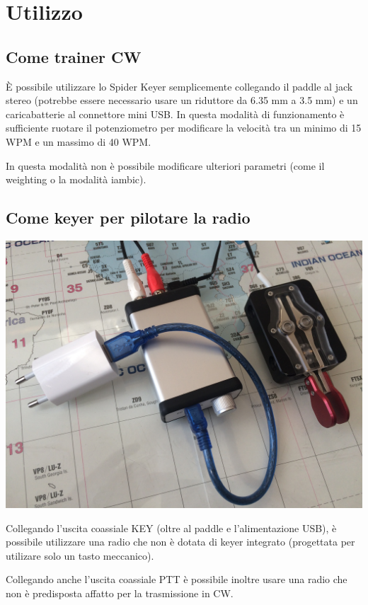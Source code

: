 \chapter{Utilizzo}

\section{Come trainer CW}
\`E possibile utilizzare lo Spider Keyer semplicemente collegando il paddle al jack stereo (potrebbe essere necessario usare un riduttore da 6.35 mm a 3.5 mm) e un caricabatterie al connettore mini USB.
In questa modalit\`a di funzionamento \`e sufficiente ruotare il potenziometro per modificare la velocit\`a tra un minimo di 15 WPM e un massimo di 40 WPM.

In questa modalit\`a non \`e possibile modificare ulteriori parametri (come il weighting o la modalit\`a iambic).

\section{Come keyer per pilotare la radio}
\begin{center}
	\includegraphics[width=\linewidth]{./Standalone.JPG}
\end{center}
Collegando l'uscita coassiale KEY (oltre al paddle e l'alimentazione USB), \`e possibile utilizzare una radio che non \`e dotata di keyer integrato (progettata per utilizare solo un tasto meccanico).

Collegando anche l'uscita coassiale PTT \`e possibile inoltre usare una radio che non \`e predisposta affatto per la trasmissione in CW.


